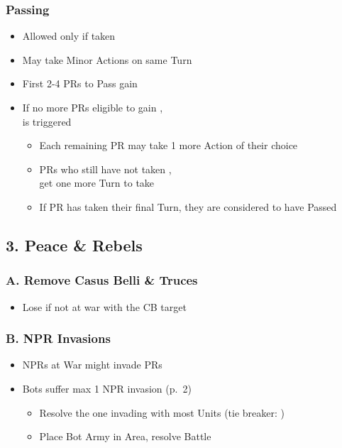 \documentclass[10pt]{article}
\begin{document}
\subsubsection*{Passing}
\begin{itemize}
	\item Allowed only if  taken
	\item May take Minor Actions on same Turn
	\item First 2-4 PRs to Pass gain \ducats
	\item If no more PRs eligible to gain \ducats,\\  is triggered
	\begin{itemize}
		\item Each remaining PR may take 1 more Action of their choice
		\item PRs who still have not taken ,\\ get one more Turn to take 
		\item If PR has taken their final Turn, they are considered to have Passed
	\end{itemize}
\end{itemize}

\subsection*{3. Peace \& Rebels}
\subsubsection*{A. Remove Casus Belli \& Truces}
\begin{itemize}
	\item Lose  if not at war with the CB target
\end{itemize}

\subsubsection*{B. NPR Invasions }
\begin{itemize}
	\item NPRs at War might invade PRs
	\botrules
	\item Bots suffer max 1 NPR invasion (p.~2)
	\begin{itemize}
		\item Resolve the one invading with most Units (tie breaker: \az)
		\item Place Bot Army in Area, resolve Battle
	\end{itemize}
\end{itemize}
\end{document}
